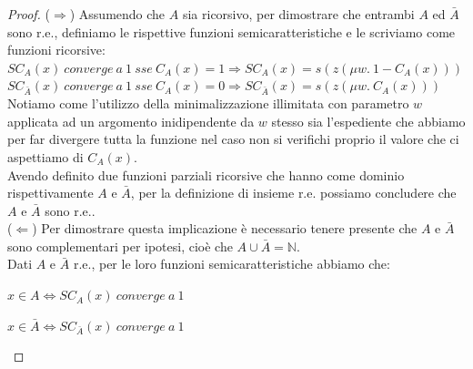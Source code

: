 \begin{proof}

($\Rightarrow$) Assumendo che $A$ sia ricorsivo, per dimostrare che entrambi $A$ ed $\bar{A}$ sono r.e., definiamo le rispettive funzioni semicaratteristiche e le scriviamo come funzioni ricorsive:\\

$SC_{A}(x)\ converge\ a\ 1\ sse\ C_{A}(x) = 1 \Rightarrow SC_{A}(x) = s(z(\mu w.\ 1 - C_{A}(x)))$\\

$SC_{\bar{A}}(x)\ converge\ a\ 1\ sse\ C_{A}(x) = 0 \Rightarrow SC_{\bar{A}}(x) = s(z(\mu w.\ C_{A}(x)))$\\

Notiamo come l'utilizzo della minimalizzazione illimitata con parametro $w$ applicata ad un argomento inidipendente da $w$ stesso sia l'espediente che abbiamo per far divergere tutta la funzione nel caso non si verifichi proprio il valore che ci aspettiamo di $C_{A}(x)$.\\
Avendo definito due funzioni parziali ricorsive che hanno come dominio rispettivamente $A$ e $\bar{A}$, per la definizione di insieme r.e. possiamo concludere che $A$ e  $\bar{A}$ sono r.e..\\

($\Leftarrow$) Per dimostrare questa implicazione \`{e} necessario tenere presente che $A$ e $\bar{A}$ sono complementari per ipotesi, cio\`{e} che $A\cup\bar{A} = \mathbb{N}$.\\
Dati $A$ e $\bar{A}$ r.e., per le loro funzioni semicaratteristiche abbiamo che:
\begin{center}
$x\in{A}\Leftrightarrow SC_{A}(x)\ converge\ a\ 1$\\\end{center}
\begin{center}
$x\in{\bar{A}}\Leftrightarrow SC_{\bar{A}}(x)\ converge\ a\ 1$\\\end{center}


\end{proof}
